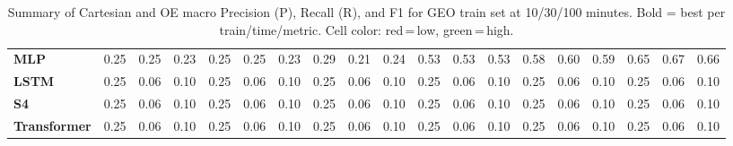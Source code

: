\begin{table}[t]
{\begin{tabular}{l ccc ccc ccc ccc ccc ccc}
\textbf{MLP} & \cellcolor[HTML]{FF6C6B}0.25 & \cellcolor[HTML]{FF6C6B}0.25 & \cellcolor[HTML]{FF6B6B}0.23 & \cellcolor[HTML]{FF6C6B}0.25 & \cellcolor[HTML]{FF6B6B}0.25 & \cellcolor[HTML]{FF6B6B}0.23 & \cellcolor[HTML]{FF7A64}0.29 & \cellcolor[HTML]{FF6B6B}0.21 & \cellcolor[HTML]{FF6B6B}0.24 & \cellcolor[HTML]{EAD340}0.53 & \cellcolor[HTML]{E9D340}0.53 & \cellcolor[HTML]{EBD340}0.53 & \cellcolor[HTML]{C5D249}0.58 & \cellcolor[HTML]{BBD24C}0.60 & \cellcolor[HTML]{C2D24A}0.59 & \cellcolor[HTML]{93D156}0.65 & \cellcolor[HTML]{87D159}0.67 & \cellcolor[HTML]{90D157}0.66 \\
\textbf{LSTM} & \cellcolor[HTML]{FF6B6B}0.25 & \cellcolor[HTML]{FF6B6B}0.06 & \cellcolor[HTML]{FF6B6B}0.10 & \cellcolor[HTML]{FF6B6B}0.25 & \cellcolor[HTML]{FF6B6B}0.06 & \cellcolor[HTML]{FF6B6B}0.10 & \cellcolor[HTML]{FF6B6B}0.25 & \cellcolor[HTML]{FF6B6B}0.06 & \cellcolor[HTML]{FF6B6B}0.10 & \cellcolor[HTML]{FF6B6B}0.25 & \cellcolor[HTML]{FF6B6B}0.06 & \cellcolor[HTML]{FF6B6B}0.10 & \cellcolor[HTML]{FF6B6B}0.25 & \cellcolor[HTML]{FF6B6B}0.06 & \cellcolor[HTML]{FF6B6B}0.10 & \cellcolor[HTML]{FF6B6B}0.25 & \cellcolor[HTML]{FF6B6B}0.06 & \cellcolor[HTML]{FF6B6B}0.10 \\
\textbf{S4} & \cellcolor[HTML]{FF6B6B}0.25 & \cellcolor[HTML]{FF6B6B}0.06 & \cellcolor[HTML]{FF6B6B}0.10 & \cellcolor[HTML]{FF6B6B}0.25 & \cellcolor[HTML]{FF6B6B}0.06 & \cellcolor[HTML]{FF6B6B}0.10 & \cellcolor[HTML]{FF6B6B}0.25 & \cellcolor[HTML]{FF6B6B}0.06 & \cellcolor[HTML]{FF6B6B}0.10 & \cellcolor[HTML]{FF6B6B}0.25 & \cellcolor[HTML]{FF6B6B}0.06 & \cellcolor[HTML]{FF6B6B}0.10 & \cellcolor[HTML]{FF6B6B}0.25 & \cellcolor[HTML]{FF6B6B}0.06 & \cellcolor[HTML]{FF6B6B}0.10 & \cellcolor[HTML]{FF6B6B}0.25 & \cellcolor[HTML]{FF6B6B}0.06 & \cellcolor[HTML]{FF6B6B}0.10 \\
\textbf{Transformer} & \cellcolor[HTML]{FF6B6B}0.25 & \cellcolor[HTML]{FF6B6B}0.06 & \cellcolor[HTML]{FF6B6B}0.10 & \cellcolor[HTML]{FF6B6B}0.25 & \cellcolor[HTML]{FF6B6B}0.06 & \cellcolor[HTML]{FF6B6B}0.10 & \cellcolor[HTML]{FF6B6B}0.25 & \cellcolor[HTML]{FF6B6B}0.06 & \cellcolor[HTML]{FF6B6B}0.10 & \cellcolor[HTML]{FF6B6B}0.25 & \cellcolor[HTML]{FF6B6B}0.06 & \cellcolor[HTML]{FF6B6B}0.10 & \cellcolor[HTML]{FF6B6B}0.25 & \cellcolor[HTML]{FF6B6B}0.06 & \cellcolor[HTML]{FF6B6B}0.10 & \cellcolor[HTML]{FF6B6B}0.25 & \cellcolor[HTML]{FF6B6B}0.06 & \cellcolor[HTML]{FF6B6B}0.10 \\
\bottomrule
\end{tabular}%
}
\caption{Summary of Cartesian and OE macro Precision (P), Recall (R), and F1 for GEO train set at 10/30/100 minutes. Bold = best per train/time/metric. Cell color: red\,=\,low, green\,=\,high.}
\label{tab:class_geo_energy_feat}
\end{table}
